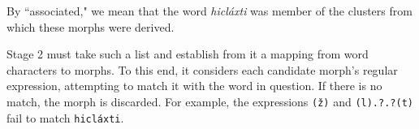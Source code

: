 By ``associated," we mean that the word \textit{hicl\'{a}xti} 
was member of the clusters from which these morphs were derived.

Stage 2 must take such a list and establish from it a mapping from word characters to morphs. To this end, it considers each candidate morph's regular expression, attempting to match it with the word in question. If there is no match, the morph is discarded. For example, the expressions \texttt{(\v{z})} and \texttt{(l).?.?(t)} fail to match \texttt{hicl\'{a}xti}. 

